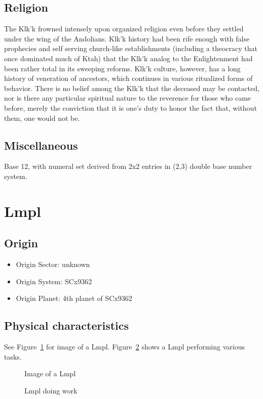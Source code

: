 \subsection{Religion}
The Klk'k frowned intensely upon organized religion even before they
settled under the wing of the Andolians. Klk'k history had been rife
enough with false prophecies and self serving church-like
establishments (including a theocracy that once dominated much of
Ktah) that the Klk'k analog to the Enlightenment had been rather total
in its sweeping reforms. Klk'k culture, however, has a long history of
veneration of ancestors, which continues in various ritualized forms
of behavior. There is no belief among the Klk'k that the deceased may
be contacted, nor is there any particular spiritual nature to the
reverence for those who came before, merely the conviction that it is
one's duty to honor the fact that, without them, one would not be.

\subsection{Miscellaneous}
Base 12, with numeral set derived from 2x2 entries in (2,3) double
base number system.

\section{Lmpl}

\subsection{Origin}
\begin{itemize}
\item Origin Sector: unknown
\item Origin System: SCx9362
\item Origin Planet: 4th planet of SCx9362
\end{itemize}

\subsection{Physical characteristics}
See Figure~\ref{fig:Lmpl} for image of a
Lmpl. Figure~\ref{fig:Lmpl-working} shows a Lmpl performing various
tasks.

\begin{figure}
\begin{center}
    \caption{Image of a Lmpl}
    \label{fig:Lmpl}
\end{center}
\end{figure}
\begin{figure}
\begin{center}
    \caption{Lmpl doing work}
    \label{fig:Lmpl-working}
\end{center}
\end{figure}



